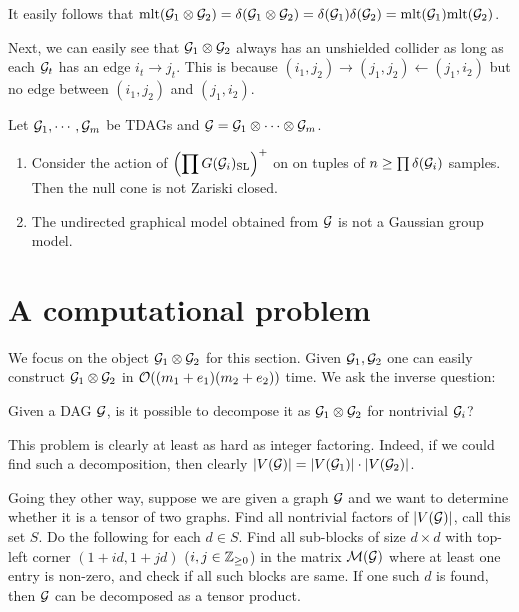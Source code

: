 It easily follows that $\text{mlt}({\mathcal{G}}_1\otimes {\mathcal{G}}_2) = \delta({\mathcal{G}}_1\otimes {\mathcal{G}}_2) = \delta({\mathcal{G}}_1)\delta({\mathcal{G}}_2) = \text{mlt}({\mathcal{G}}_1)\text{mlt}({\mathcal{G}}_2)$.

Next, we can easily see that ${\mathcal{G}}_1\otimes {\mathcal{G}}_2$ always has an unshielded collider as long as each ${\mathcal{G}}_t$ has an edge $i_t\to j_t$. This is because $(i_1,j_2) \rightarrow (j_1,j_2) \leftarrow (j_1,i_2)$ but no edge between $(i_1,j_2)$ and $(j_1,i_2)$. 

\begin{cor}
Let ${\mathcal{G}}_1,\cdots,{\mathcal{G}}_m$ be TDAGs and ${\mathcal{G}} = {\mathcal{G}}_1\otimes \cdots\otimes {\mathcal{G}}_m$. 
\begin{enumerate}[leftmargin=*]
\item Consider the action of $\displaystyle \left(\prod G({\mathcal{G}}_i)_{\text{SL}}\right)^+$ on on tuples of $n\geq \prod\delta({\mathcal{G}}_i)$ samples. Then the null cone is not Zariski closed.
\item The undirected graphical model obtained from ${\mathcal{G}}$ is not a Gaussian group model.
\end{enumerate}
\end{cor}



\section{A computational problem}

We focus on the object ${\mathcal{G}}_1\otimes {\mathcal{G}}_2$ for this section. Given ${\mathcal{G}}_1,{\mathcal{G}}_2$ one can easily construct ${\mathcal{G}}_1\otimes {\mathcal{G}}_2$ in ${\mathcal{O}}((m_1+e_1)(m_2 + e_2))$ time. We ask the inverse question:
\begin{qs}Given a DAG ${\mathcal{G}}$, is it possible to decompose it as ${\mathcal{G}}_1\otimes {\mathcal{G}}_2$ for nontrivial ${\mathcal{G}}_i$?\end{qs} 

This problem is clearly at least as hard as integer factoring. Indeed, if we could find such a decomposition, then clearly $\left| V({\mathcal{G}}) \right| = \left| V({\mathcal{G}}_1) \right|\cdot \left| V({\mathcal{G}}_2) \right|$.

Going they other way, suppose we are given a graph ${\mathcal{G}}$ and we want to determine whether it is a tensor of two graphs. Find all nontrivial factors of $\left| V({\mathcal{G}}) \right|$, call this set $S$. Do the following for each $d\in S$. Find all sub-blocks of size $d\times d$ with top-left corner $(1+id,1+jd)$ ($i,j\in \mathbb{Z}_{\geq0}$) in the matrix ${\mathcal{M}}({\mathcal{G}})$ where at least one entry is non-zero, and check if all such blocks are same. If one such $d$ is found, then ${\mathcal{G}}$ can be decomposed as a tensor product.

